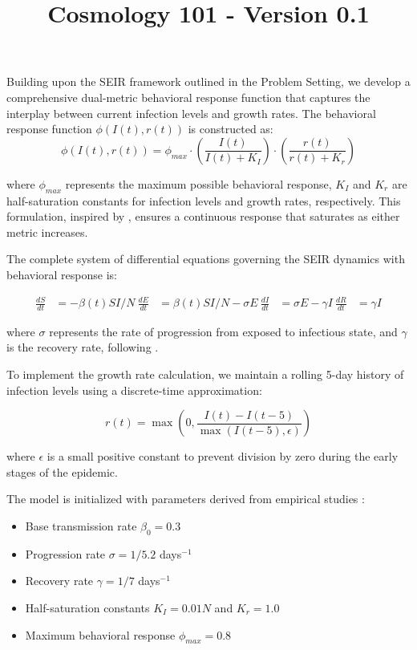 \documentclass{article}\usepackage{graphicx} \usepackage{amsmath} \usepackage{colortbl}\title{Cosmology 101 - Version 0.1}
\begin{document}
Building upon the SEIR framework outlined in the Problem Setting, we develop a comprehensive dual-metric behavioral response function that captures the interplay between current infection levels and growth rates. The behavioral response function $\phi(I(t), r(t))$ is constructed as:
\begin{equation}
\phi(I(t), r(t)) = \phi_{max} \cdot \left(\frac{I(t)}{I(t) + K_I}\right) \cdot \left(\frac{r(t)}{r(t) + K_r}\right)
\end{equation}

where $\phi_{max}$ represents the maximum possible behavioral response, $K_I$ and $K_r$ are half-saturation constants for infection levels and growth rates, respectively. This formulation, inspired by \citet{funk2010modelling}, ensures a continuous response that saturates as either metric increases.

The complete system of differential equations governing the SEIR dynamics with behavioral response is:

\begin{align}
\frac{dS}{dt} &= -\beta(t)SI/N \
\frac{dE}{dt} &= \beta(t)SI/N - \sigma E \
\frac{dI}{dt} &= \sigma E - \gamma I \
\frac{dR}{dt} &= \gamma I
\end{align}

where $\sigma$ represents the rate of progression from exposed to infectious state, and $\gamma$ is the recovery rate, following \citet{anderson1992infectious}.

To implement the growth rate calculation, we maintain a rolling 5-day history of infection levels using a discrete-time approximation:

\begin{equation}
r(t) = \max\left(0, \frac{I(t) - I(t-5)}{\max(I(t-5), \epsilon)}\right)
\end{equation}

where $\epsilon$ is a small positive constant to prevent division by zero during the early stages of the epidemic.

The model is initialized with parameters derived from empirical studies \cite{hethcote2000mathematics}:
\begin{itemize}
\item Base transmission rate $\beta_0 = 0.3$
\item Progression rate $\sigma = 1/5.2$ days$^{-1}$
\item Recovery rate $\gamma = 1/7$ days$^{-1}$
\item Half-saturation constants $K_I = 0.01N$ and $K_r = 1.0$
\item Maximum behavioral response $\phi_{max} = 0.8$
\end{itemize}
\end{document}

